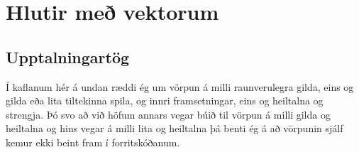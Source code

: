 





\chapter{Hlutir með vektorum}

\section{Upptalningartög}

Í kaflanum hér á undan ræddi ég um vörpun á milli raunverulegra gilda, eins og gilda eða lita tiltekinna spila, 
og innri framsetningar, eins og heiltalna og strengja.
Þó svo að við höfum annars vegar búið til vörpun á milli gilda og heiltalna og hins vegar á milli lita og heiltalna
þá benti ég á að vörpunin sjálf kemur ekki beint fram í forritskóðanum.


